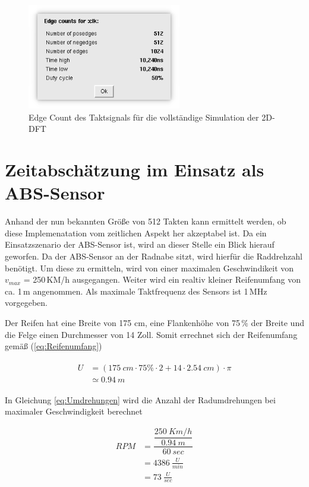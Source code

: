  \begin{figure}[htbp]
  \centering
  \includegraphics[width=0.6\textwidth]{img/Simulation_edge_count_clk.png}
  \caption{Edge Count des Taktsignals für die vollständige Simulation der 2D-DFT}
 \end{figure}

 \section{Zeitabschätzung im Einsatz als ABS-Sensor}
 Anhand der nun bekannten Größe von 512 Takten kann ermittelt werden, ob diese Implemenatation vom zeitlichen Aspekt her akzeptabel ist.
 Da ein Einsatzszenario der ABS-Sensor ist, wird an dieser Stelle ein Blick hierauf geworfen. Da der ABS-Sensor an der Radnabe sitzt, wird 
 hierfür die Raddrehzahl benötigt. Um diese zu ermitteln, wird von einer maximalen Geschwindikeit von $v_{max}$ = 250\,KM/h ausgegangen. 
 Weiter wird ein realtiv kleiner Reifenumfang von ca. 1\,m angenommen. Als maximale Taktfrequenz des Sensors ist 1\,MHz vorgegeben.
 
 Der Reifen hat eine Breite von 175 cm, eine Flankenhöhe von 75\,$\%$ der Breite und die Felge einen Durchmesser von 14 Zoll. Somit errechnet sich der Reifenumfang
 gemäß (\ref{eq:Reifenumfang})
 
 \begin{align}\label{eq:Reifenumfang}
 \begin{split}
  U &= (\SI{175}{cm} \cdot 75\% \cdot 2 + 14 \cdot \SI{2.54}{cm})\cdot \pi\\
    &\simeq \SI{0,94}{m}
 \end{split}
 \end{align}

 In Gleichung \ref{eq:Umdrehungen} wird die Anzahl der Radumdrehungen bei maximaler Geschwindigkeit berechnet
 
 \begin{equation}\label{eq:Umdrehungen}
  \begin{split}
   RPM &= \dfrac{\dfrac{\SI{250}{Km/h}}{\SI{0,94}{m}}}{\SI{60}{sec}}\\
       &= \SI{4386}{\frac{U}{min}}\\
       &= \SI{73}{\frac{U}{sec}}
  \end{split}
 \end{equation}

